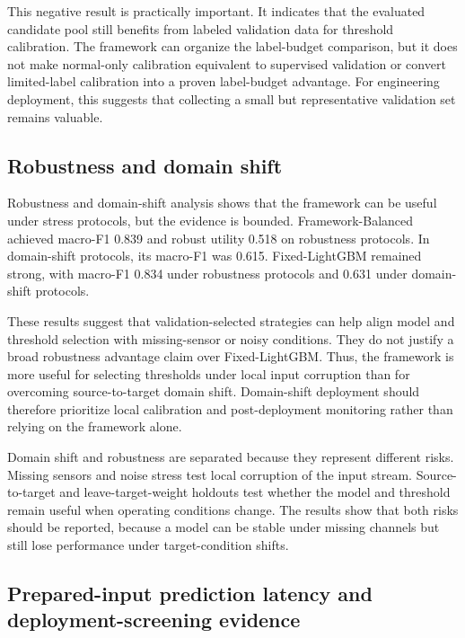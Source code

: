 This negative result is practically important. It indicates that the evaluated candidate pool still benefits from labeled validation data for threshold calibration. The framework can organize the label-budget comparison, but it does not make normal-only calibration equivalent to supervised validation or convert limited-label calibration into a proven label-budget advantage. For engineering deployment, this suggests that collecting a small but representative validation set remains valuable.




\subsection{Robustness and domain shift}



Robustness and domain-shift analysis shows that the framework can be useful under stress protocols, but the evidence is bounded. Framework-\allowbreak Balanced achieved macro-F1 0.839 and robust utility 0.518 on robustness protocols. In domain-shift protocols, its macro-F1 was 0.615. Fixed-\allowbreak LightGBM remained strong, with macro-F1 0.834 under robustness protocols and 0.631 under domain-shift protocols.





These results suggest that validation-selected strategies can help align model and threshold selection with missing-sensor or noisy conditions. They do not justify a broad robustness advantage claim over Fixed-\allowbreak LightGBM. Thus, the framework is more useful for selecting thresholds under local input corruption than for overcoming source-to-target domain shift. Domain-shift deployment should therefore prioritize local calibration and post-deployment monitoring rather than relying on the framework alone.

Domain shift and robustness are separated because they represent different risks. Missing sensors and noise stress test local corruption of the input stream. Source-to-target and leave-target-weight holdouts test whether the model and threshold remain useful when operating conditions change. The results show that both risks should be reported, because a model can be stable under missing channels but still lose performance under target-condition shifts.




\subsection{Prepared-input prediction latency and deployment-screening evidence}



